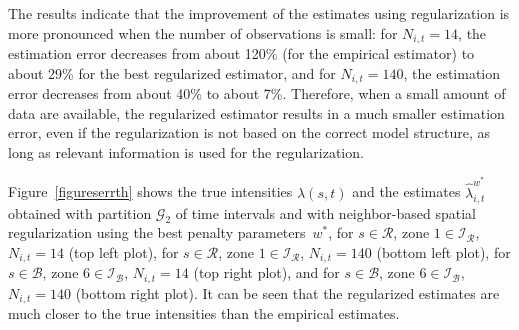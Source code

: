 \documentclass[article]{jss}
\begin{document}
The results indicate that the improvement of the estimates using regularization is more pronounced when the number of observations is small: for $N_{i,t} = 14$, the estimation error decreases from about 120\% (for the empirical estimator) to about 29\% for the best regularized estimator, and for $N_{i,t} = 140$, the estimation error decreases from about 40\% to about 7\%.
Therefore, when a small amount of data are available, the regularized estimator results in a much smaller estimation error, even if the regularization is not based on the correct model structure, as long as relevant information is used for the regularization.

Figure~\ref{figureserrth} shows the true intensities $\lambda(s,t)$ and the estimates $\hat{\lambda}^{w^*}_{i,t}$ obtained with partition $\mathcal{G}_{2}$ of time intervals and with neighbor-based spatial regularization using the best penalty parameters~$w^*$, for $s \in \mathcal{R}$, zone $1 \in \mathcal{I}_{\mathcal{R}}$, $N_{i,t} = 14$ (top left plot), for $s \in \mathcal{R}$, zone $1 \in \mathcal{I}_{\mathcal{R}}$, $N_{i,t} = 140$ (bottom left plot), for $s \in \mathcal{B}$, zone $6 \in \mathcal{I}_{\mathcal{B}}$, $N_{i,t} = 14$ (top right plot), and for $s \in \mathcal{B}$, zone $6 \in \mathcal{I}_{\mathcal{B}}$, $N_{i,t} = 140$ (bottom right plot).
It can be seen that the regularized estimates are much closer to the true intensities than the empirical estimates.
\end{document}
